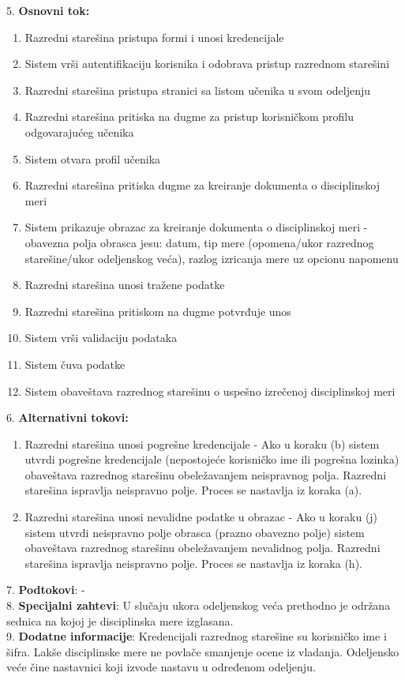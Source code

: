\documentclass{article}
\begin{document}
5. \textbf{Osnovni tok:} 
\begin{enumerate} [label=(\alph*)]
\item Razredni starešina pristupa formi i unosi kredencijale 
\item Sistem vrši autentifikaciju korisnika i odobrava pristup razrednom starešini
\item Razredni starešina pristupa stranici sa listom učenika u svom odeljenju
\item Razredni starešina pritiska na dugme za pristup korisničkom profilu odgovarajućeg učenika
\item Sistem otvara profil učenika
\item Razredni starešina pritiska dugme za kreiranje dokumenta o disciplinskoj meri
\item Sistem prikazuje obrazac za kreiranje dokumenta o disciplinskoj meri - obavezna polja obrasca jesu: datum, tip mere (opomena/ukor razrednog starešine/ukor odeljenskog veća), razlog izricanja mere uz opcionu napomenu
\item Razredni starešina unosi tražene podatke
\item Razredni starešina pritiskom na dugme potvrđuje unos
\item Sistem vrši validaciju podataka
\item Sistem čuva podatke
\item Sistem obaveštava razrednog starešinu o uspešno izrečenoj disciplinskoj meri
\end{enumerate}

6. \textbf{Alternativni tokovi:}
\begin{enumerate} [label=(\roman*)]
\item Razredni starešina unosi pogrešne kredencijale - Ako u koraku (b) sistem utvrdi pogrešne kredencijale (nepostojeće korisničko ime ili pogrešna lozinka) obaveštava razrednog starešinu obeležavanjem neispravnog polja. Razredni starešina ispravlja neispravno polje. Proces se nastavlja iz koraka (a).
\item Razredni starešina unosi nevalidne podatke u obrazac - Ako u koraku (j) sistem utvrdi neispravno polje obrasca (prazno obavezno polje) sistem obaveštava razrednog starešinu obeležavanjem nevalidnog polja. Razredni starešina ispravlja neispravno polje. Proces se nastavlja iz koraka (h).
\end{enumerate}

7. \textbf{Podtokovi}: - \\

8. \textbf{Specijalni zahtevi}: U slučaju ukora odeljenskog veća prethodno je održana sednica na kojoj je disciplinska mere izglasana. \\

9. \textbf{Dodatne informacije}: Kredencijali razrednog starešine su korisničko ime i šifra. Lakše disciplinske mere ne povlače smanjenje ocene iz vladanja. Odeljensko veće čine nastavnici koji izvode nastavu u određenom odeljenju. \\
\end{document}
